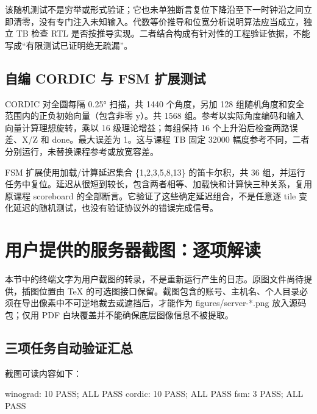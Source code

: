 \documentclass[
  10pt,
  a4paper,
]{article}
\newenvironment{Shaded}{}{}
\newcommand{\NormalTok}[1]{#1}
\begin{document}
该随机测试不是穷举或形式验证；它也未单独断言复位下降沿至下一时钟沿之间立即清零，没有专门注入未知输入。代数等价推导和位宽分析说明算法应当成立，独立
TB 检查 RTL
是否按推导实现。二者结合构成有针对性的工程验证依据，不能写成``有限测试已证明绝无疏漏''。

\subsection{自编 CORDIC 与 FSM
扩展测试}\label{ux81eaux7f16-cordic-ux4e0e-fsm-ux6269ux5c55ux6d4bux8bd5}

CORDIC 对全圆每隔 0.25° 扫描，共 1440 个角度，另加 128
组随机角度和安全范围内的正负初始向量（包含非零 y）。共 1568
组。参考以实际角度编码和输入向量计算理想旋转，乘以 16
级理论增益；每组保持 16 个上升沿后检查两路误差、X/Z 和 done。最大误差为
1。这与课程 TB 固定 32000
幅度参考不同，二者分别运行，未替换课程参考或放宽容差。

FSM 扩展使用加载/计算延迟集合 \{1,2,3,5,8,13\} 的笛卡尔积，共 36
组，并运行任务中复位。延迟从很短到较长，包含两者相等、加载快和计算快三种关系，复用原课程
scoreboard 的全部断言。它验证了这些确定延迟组合，不是任意逐 tile
变化延迟的随机测试，也没有验证协议外的错误完成信号。

\section{用户提供的服务器截图：逐项解读}\label{ux7528ux6237ux63d0ux4f9bux7684ux670dux52a1ux5668ux622aux56feux9010ux9879ux89e3ux8bfb}

本节中的终端文字为用户截图的转录，不是重新运行产生的日志。原图文件尚待提供，插图位置由
TeX
的可选图接口保留。截图包含的账号、主机名、个人目录必须在导出像素中不可逆地裁去或遮挡后，才能作为
figures/server-*.png 放入源码包；仅用 PDF
白块覆盖并不能确保底层图像信息不被提取。

\subsection{三项任务自动验证汇总}\label{ux4e09ux9879ux4efbux52a1ux81eaux52a8ux9a8cux8bc1ux6c47ux603b}

截图可读内容如下：

\begin{Shaded}
\begin{Highlighting}[]
\NormalTok{winograd: 10 PASS; ALL PASS}
\NormalTok{cordic: 10 PASS; ALL PASS}
\NormalTok{fsm: 3 PASS; ALL PASS}
\end{Highlighting}
\end{Shaded}
\end{document}
